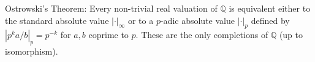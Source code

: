 Ostrowski's Theorem: Every non-trivial real valuation of $\mathbb{Q}$ is equivalent either to the standard absolute value $|\cdot|_\infty$ or to a $p$-adic absolute value $|\cdot|_p$ defined by $|p^k a/b|_p = p^{-k}$ for $a, b$ coprime to $p$. These are the only completions of $\mathbb{Q}$ (up to isomorphism).

